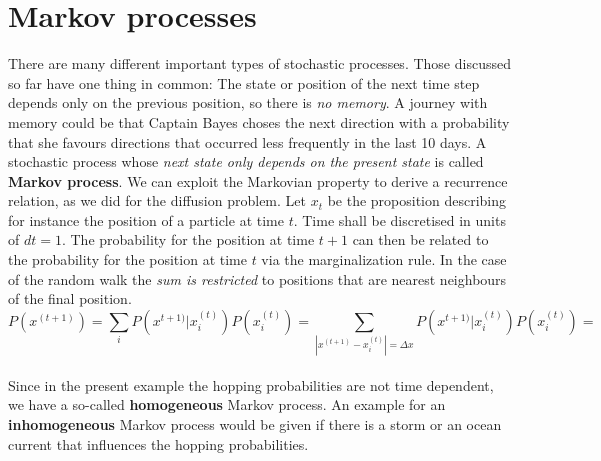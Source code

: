 \documentclass[12pt, a4paper]{scrartcl}
\begin{document}
\section*{Markov processes}
There are many different important types of stochastic processes. Those discussed so far have one thing in common: The state or position of the next time step depends only on the previous position, so there is \textit{no memory}. A journey with memory could be that Captain Bayes choses the next direction with a probability that she favours directions that occurred less frequently in the last 10 days.
A stochastic process whose \textit{next state only depends on the present state} is called \textbf{Markov process}. 
We can exploit the Markovian property to derive a recurrence relation, as we did for the diffusion problem. 
Let $x_t$ be the proposition describing for instance the position of a particle at time $t$. Time shall be discretised in units of $dt=1$. The probability for the position at time $t+1$  can then be related to the probability for the position at time $t$ via the marginalization rule.
In the case of the random walk the \textit{sum is restricted} to positions that are nearest neighbours of the final position.
\begin{equation*}\boxed{P(x^{(t+1)})=\sum_iP(x^{t+1)}|x_i^{(t)})P(x_i^{(t)})=\sum_{|x^{(t+1)}-x_i^{(t)}|=\Delta x}P(x^{t+1)}|x_i^{(t)})P(x_i^{(t)})=
}\end{equation*}\\
Since in the present example the hopping probabilities are not time dependent, we have a so-called \textbf{homogeneous} Markov process.  An example for an \textbf{inhomogeneous} Markov process would be given if there is a storm or an ocean current that influences the hopping probabilities.\\

\\
\end{document}
